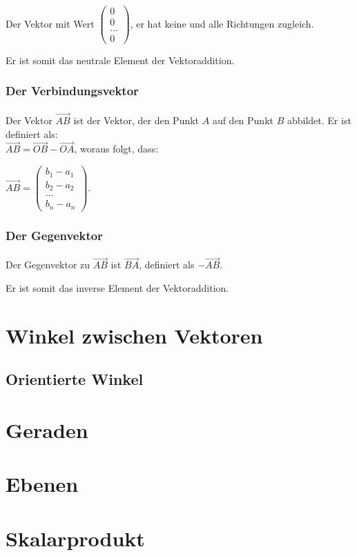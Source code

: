 \paragraph{} Der Vektor mit Wert $\left(\begin{array}{c} 0 \\ 0 \\ ...\\0\end{array}\right)$, er hat keine und alle Richtungen zugleich.
\begin{Bemerkung}
Er ist somit das neutrale Element der Vektoraddition.
\end{Bemerkung}

\subsubsection{Der Verbindungsvektor}

\paragraph{} Der Vektor $\vec{AB}$ ist der Vektor, der den Punkt $A$ auf den Punkt $B$ abbildet. Er ist definiert als:\\ $\vec{AB}=\vec{OB}-\vec{OA}$, woraus folgt, dass: \begin{center} $\vec{AB} = \left(\begin{array}{c} b_1 - a_1 \\ b_2 - a_2 \\ ... \\ b_n - a_n \end{array}\right)$. \end{center}

\subsubsection{Der Gegenvektor}

\paragraph{} Der Gegenvektor zu $\vec{AB}$ ist $\vec{BA}$, definiert als  $-\vec{AB}$.
\begin{Bemerkung}
Er ist somit das inverse Element der Vektoraddition.
\end{Bemerkung}
\section{Winkel zwischen Vektoren}\subsection{Orientierte Winkel}

\section{Geraden}
\section{Ebenen}
\section{Skalarprodukt}
